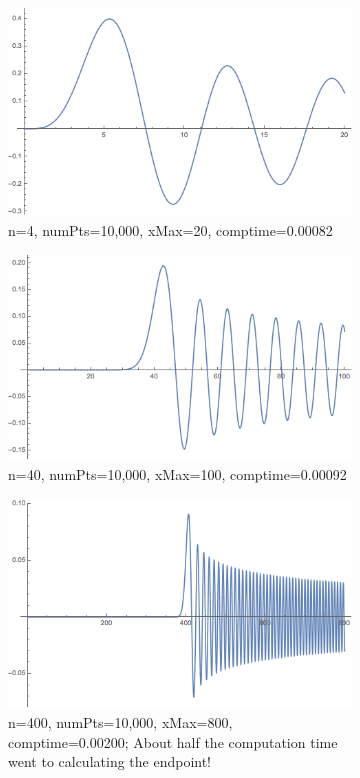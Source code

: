 \documentclass[onecolumn, groupedaddress, 10pt]{revtex4-1}
\begin{document}
\begin{figure}[H]
	\centering
	\begin{subfigure}{.5\textwidth}
  		\centering
  		\includegraphics[width=.5\linewidth]{BesselJ4.png}
  		\caption{n=4, numPts=10,000, xMax=20, comptime=0.00082}
	\end{subfigure}%
	\begin{subfigure}{.5\textwidth}
  		\centering
  		\includegraphics[width=.5\linewidth]{BesselJ40.png}
  		\caption{n=40, numPts=10,000, xMax=100, comptime=0.00092}
	\end{subfigure}
	\begin{subfigure}{.5\textwidth}
  		\centering
  		\includegraphics[width=.5\linewidth]{BesselJ400.png}
  		\caption{n=400, numPts=10,000, xMax=800, comptime=0.00200;  About half the computation time went to calculating the endpoint!}
	\end{subfigure}
	\caption{\label{fig:selectBesselFunctions}}
\end{figure}
\end{document}
